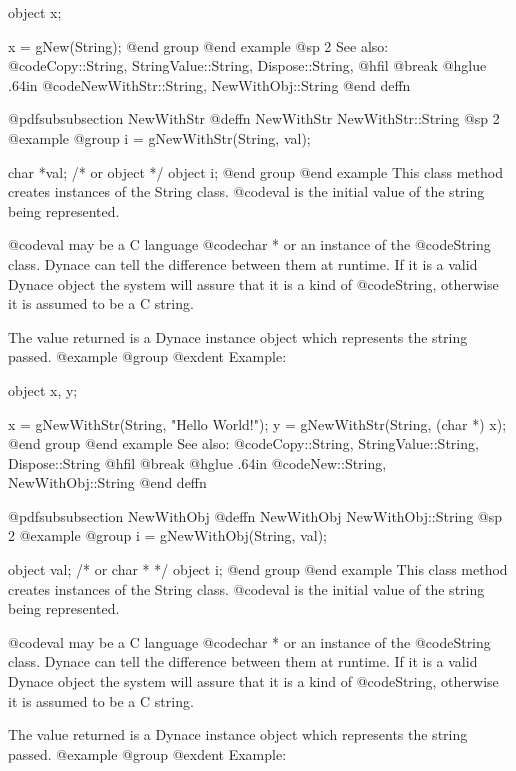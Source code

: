object  x;

x = gNew(String);
@end group
@end example
@sp 2
See also:  @code{Copy::String, StringValue::String, Dispose::String,}
@hfil @break @hglue .64in      @code{NewWithStr::String, NewWithObj::String}
@end deffn








@pdfsubsubsection {NewWithStr}
@deffn {NewWithStr} NewWithStr::String
@sp 2
@example
@group
i = gNewWithStr(String, val);

char *val;  /*  or object  */
object  i;
@end group
@end example
This class method creates instances of the String class.  @code{val}
is the initial value of the string being represented.  

@code{val} may be a C language @code{char *} or an instance of the
@code{String} class.  Dynace can tell the difference between them at
runtime.  If it is a valid Dynace object the system will assure that it is
a kind of @code{String}, otherwise it is assumed to be a C string.

The value returned is a Dynace instance object which represents the string
passed.
@example
@group
@exdent Example:

object  x, y;

x = gNewWithStr(String, "Hello World!");
y = gNewWithStr(String, (char *) x);
@end group
@end example
See also:  @code{Copy::String, StringValue::String, Dispose::String}
@hfil @break @hglue .64in     @code{New::String, NewWithObj::String}
@end deffn












@pdfsubsubsection {NewWithObj}
@deffn {NewWithObj} NewWithObj::String
@sp 2
@example
@group
i = gNewWithObj(String, val);

object  val;  /*  or char *  */
object  i;
@end group
@end example
This class method creates instances of the String class.  @code{val}
is the initial value of the string being represented.  

@code{val} may be a C language @code{char *} or an instance of the
@code{String} class.  Dynace can tell the difference between them at
runtime.  If it is a valid Dynace object the system will assure that it is
a kind of @code{String}, otherwise it is assumed to be a C string.

The value returned is a Dynace instance object which represents the string
passed.
@example
@group
@exdent Example:

